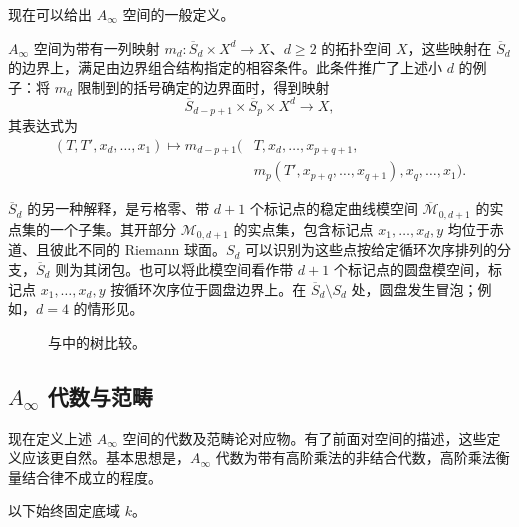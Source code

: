 现在可以给出 $A_\infty$ 空间的一般定义。
\begin{definition*}\label{def:8.ainfty-space}
$A_\infty$ 空间为带有一列映射 $m_d\colon\overline S_d\times X^d\to X$、$d\geq2$ 的拓扑空间 $X$，这些映射在 $\overline S_d$ 的边界上，满足由边界组合结构指定的相容条件。此条件推广了上述小 $d$ 的例子：将 $m_d$ 限制到的括号确定的边界面时，得到映射
\[
\overline S_{d-p+1}\times\overline S_p\times X^d\longrightarrow X,
\]
其表达式为
\[
\begin{aligned}
(T,T',x_d,\ldots,x_1)\longmapsto
m_{d-p+1}\bigl(&T,x_d,\ldots,x_{p+q+1},\\
&m_p(T',x_{p+q},\ldots,x_{q+1}),x_q,\ldots,x_1\bigr).
\end{aligned}
\]
\end{definition*}

\begin{note}[numbered]\label{note:8.3}
$\overline S_d$ 的另一种解释，是亏格零、带 $d+1$ 个标记点的稳定曲线模空间 $\overline{\mathcal M}_{0,d+1}$ 的实点集的一个子集。其开部分 $\mathcal M_{0,d+1}$ 的实点集，包含标记点 $x_1,\ldots,x_d,y$ 均位于赤道、且彼此不同的 Riemann 球面。$S_d$ 可以识别为这些点按给定循环次序排列的分支，$\overline S_d$ 则为其闭包。也可以将此模空间看作带 $d+1$ 个标记点的圆盘模空间，标记点 $x_1,\ldots,x_d,y$ 按循环次序位于圆盘边界上。在 $\overline S_d\setminus S_d$ 处，圆盘发生冒泡；例如，$d=4$ 的情形见。
\end{note}
\begin{figure}[H]
\centering
{}
\caption{与中的树比较。}\label{fig:8.9}
\end{figure}

\subsection{\texorpdfstring{$A_\infty$}{A∞} 代数与范畴}\label{sec:8.1.2}

现在定义上述 $A_\infty$ 空间的代数及范畴论对应物。有了前面对空间的描述，这些定义应该更自然。基本思想是，$A_\infty$ 代数为带有高阶乘法的非结合代数，高阶乘法衡量结合律不成立的程度。

以下始终固定底域 $k$。

